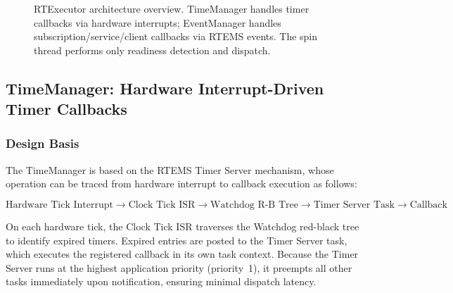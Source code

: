 \begin{figure}[t]
\centering
{}
\caption{RTExecutor architecture overview.  TimeManager handles timer callbacks via hardware interrupts; EventManager handles subscription/service/client callbacks via RTEMS events.  The spin thread performs only readiness detection and dispatch.}
\label{fig:architecture}
\end{figure}

\subsection{TimeManager: Hardware Interrupt-Driven Timer Callbacks}

\subsubsection{Design Basis}

The TimeManager is based on the RTEMS Timer Server mechanism, whose operation can be traced from hardware interrupt to callback execution as follows:

\begin{equation}
\text{Hardware Tick Interrupt} \to \text{Clock Tick ISR} \to \text{Watchdog R-B Tree} \to \text{Timer Server Task} \to \text{Callback}
\end{equation}

On each hardware tick, the Clock Tick ISR traverses the Watchdog red-black tree to identify expired timers.  Expired entries are posted to the Timer Server task, which executes the registered callback in its own task context.  Because the Timer Server runs at the highest application priority (priority~1), it preempts all other tasks immediately upon notification, ensuring minimal dispatch latency.

